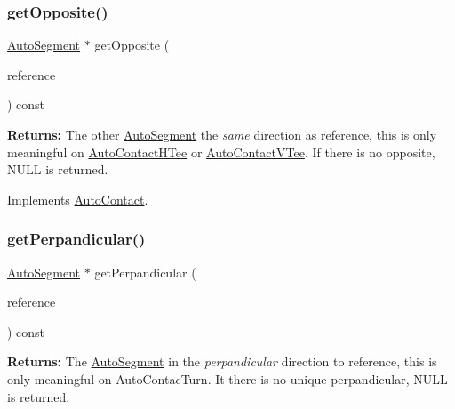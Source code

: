 \subsubsection{\texorpdfstring{get\+Opposite()}{getOpposite()}}
{\footnotesize\ttfamily \hyperlink{classKatabatic_1_1AutoSegment}{Auto\+Segment} $\ast$ get\+Opposite (\begin{DoxyParamCaption}\item[{const \hyperlink{classKatabatic_1_1AutoSegment}{Auto\+Segment} $\ast$}]{reference }\end{DoxyParamCaption}) const\hspace{0.3cm}{\ttfamily [virtual]}}

{\bfseries Returns\+:} The other \hyperlink{classKatabatic_1_1AutoSegment}{Auto\+Segment} the {\itshape same} direction as {\ttfamily reference}, this is only meaningful on \hyperlink{classKatabatic_1_1AutoContactHTee}{Auto\+Contact\+H\+Tee} or \hyperlink{classKatabatic_1_1AutoContactVTee}{Auto\+Contact\+V\+Tee}. If there is no opposite, {\ttfamily N\+U\+LL} is returned. 

Implements \hyperlink{classKatabatic_1_1AutoContact_a48ab1d3bdf85712e4784ef83ef136939}{Auto\+Contact}.

\mbox{\label{classKatabatic_1_1AutoContactTerminal_ad99dd549214e43b6509fd8e3aefae919}} 
\subsubsection{\texorpdfstring{get\+Perpandicular()}{getPerpandicular()}}
{\footnotesize\ttfamily \hyperlink{classKatabatic_1_1AutoSegment}{Auto\+Segment} $\ast$ get\+Perpandicular (\begin{DoxyParamCaption}\item[{const \hyperlink{classKatabatic_1_1AutoSegment}{Auto\+Segment} $\ast$}]{reference }\end{DoxyParamCaption}) const\hspace{0.3cm}{\ttfamily [virtual]}}

{\bfseries Returns\+:} The \hyperlink{classKatabatic_1_1AutoSegment}{Auto\+Segment} in the {\itshape perpandicular} direction to {\ttfamily reference}, this is only meaningful on Auto\+Contac\+Turn. It there is no unique perpandicular, {\ttfamily N\+U\+LL} is returned. 

